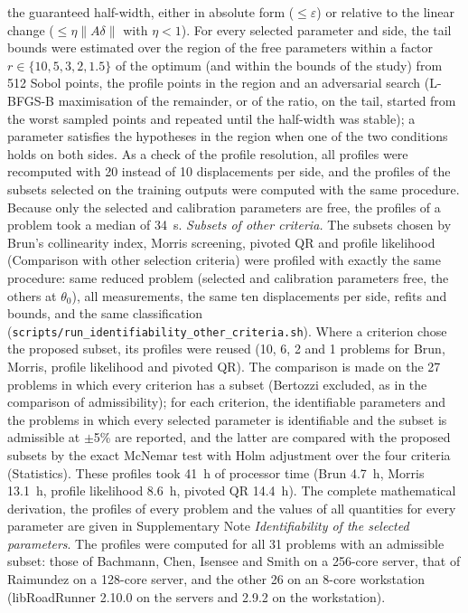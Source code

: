 \documentclass[pdflatex,sn-nature]{sn-jnl}
\theoremstyle{plain}
\begin{document}
the guaranteed half-width, either in absolute form ($\le\varepsilon$) or relative to the linear change ($\le\eta\|A\delta\|$ with $\eta<1$). For every selected parameter and side, the tail bounds were estimated over the region of the free parameters within a factor $r\in\{10,5,3,2,1.5\}$ of the optimum (and within the bounds of the study) from 512 Sobol points, the profile points in the region and an adversarial search (L-BFGS-B maximisation of the remainder, or of the ratio, on the tail, started from the worst sampled points and repeated until the half-width was stable); a parameter satisfies the hypotheses in the region when one of the two conditions holds on both sides. As a check of the profile resolution, all profiles were recomputed with 20 instead of 10 displacements per side, and the profiles of the subsets selected on the training outputs were computed with the same procedure. Because only the selected and calibration parameters are free, the profiles of a problem took a median of 34~s. \label{met:identif-crit}\emph{Subsets of other criteria.} The subsets chosen by Brun's collinearity index, Morris screening, pivoted QR and profile likelihood (Comparison with other selection criteria) were profiled with exactly the same procedure: same reduced problem (selected and calibration parameters free, the others at $\theta_0$), all measurements, the same ten displacements per side, refits and bounds, and the same classification (\texttt{scripts/run\_identifiability\_other\_criteria.sh}). Where a criterion chose the proposed subset, its profiles were reused (10, 6, 2 and 1 problems for Brun, Morris, profile likelihood and pivoted QR). The comparison is made on the 27 problems in which every criterion has a subset (Bertozzi excluded, as in the comparison of admissibility); for each criterion, the identifiable parameters and the problems in which every selected parameter is identifiable and the subset is admissible at $\pm$5\% are reported, and the latter are compared with the proposed subsets by the exact McNemar test with Holm adjustment over the four criteria (Statistics). These profiles took 41~h of processor time (Brun 4.7~h, Morris 13.1~h, profile likelihood 8.6~h, pivoted QR 14.4~h). The complete mathematical derivation, the profiles of every problem and the values of all quantities for every parameter are given in Supplementary Note \textit{Identifiability of the selected parameters}. The profiles were computed for all 31 problems with an admissible subset: those of Bachmann, Chen, Isensee and Smith on a 256-core server, that of Raimundez on a 128-core server, and the other 26 on an 8-core workstation (libRoadRunner 2.10.0 on the servers and 2.9.2 on the workstation).
\end{document}
